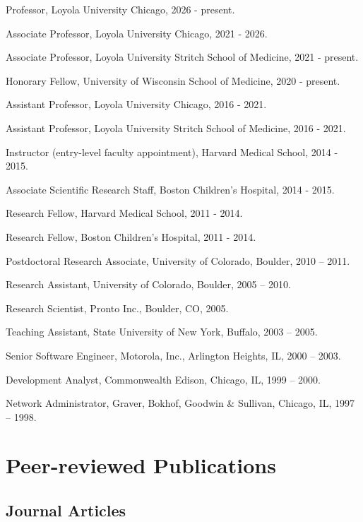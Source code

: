 \documentclass[letterpaper]{article}
\renewenvironment{itemize}{
  \begin{list}{}{
    \setlength{\leftmargin}{1.5em}
  }
}{
  \end{list}
}
\begin{document}
\begin{itemize}
\item Professor, Loyola University Chicago, 2026 - present.
\item Associate Professor, Loyola University Chicago, 2021 - 2026.
\item Associate Professor, Loyola University Stritch School of Medicine, 2021 - present.
\item Honorary Fellow, University of Wisconsin School of Medicine, 2020 - present.
\item Assistant Professor, Loyola University Chicago, 2016 - 2021.
\item Assistant Professor, Loyola University Stritch School of Medicine, 2016 - 2021.
\item Instructor (entry-level faculty appointment), Harvard Medical School, 2014 - 2015.
\item Associate Scientific Research Staff, Boston Children's Hospital, 2014 - 2015.
\item Research Fellow, Harvard Medical School, 2011 - 2014.
\item Research Fellow, Boston Children's Hospital, 2011 - 2014.
\item Postdoctoral Research Associate, University of Colorado, Boulder, 2010 -- 2011.
\item Research Assistant, University of Colorado, Boulder, 2005 -- 2010.
\item Research Scientist, Pronto Inc., Boulder, CO, 2005.
\item Teaching Assistant, State University of New York, Buffalo, 2003 -- 2005.
\item Senior Software Engineer, Motorola, Inc., Arlington Heights, IL, 2000 -- 2003.
\item Development Analyst, Commonwealth Edison, Chicago, IL, 1999 -- 2000.
\item Network Administrator, Graver, Bokhof, Goodwin \& Sullivan, Chicago, IL, 1997 -- 1998.
\end{itemize}

\section*{Peer-reviewed Publications}

\subsection*{Journal Articles}
\end{document}
